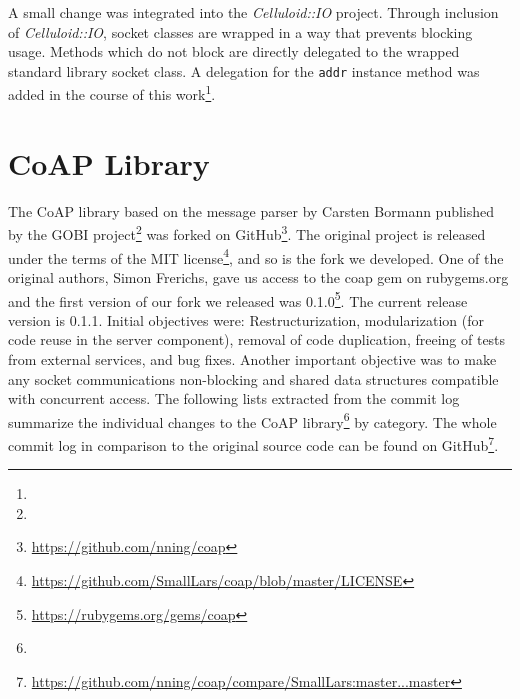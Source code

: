 	A small change was integrated into the \emph{Celluloid::IO} project.
	Through inclusion of \emph{Celluloid::IO}, socket classes are wrapped in a
	way that prevents blocking usage. Methods which do not block are directly
	delegated to the wrapped standard library socket class. A delegation for
	the \texttt{addr} instance method was added in the course of this
	work\footnote{\urlCelluloidIoPr}.

\section{\acs{CoAP} Library}
\label{cha:implementation:client}

	The \ac{CoAP} library based on the message parser by Carsten Bormann
	published by the GOBI project\footnote{\urlGobiCoap} was forked on
	GitHub\footnote{\url{https://github.com/nning/coap}}. The original project
	is released under the terms of the MIT
	license\footnote{\url{https://github.com/SmallLars/coap/blob/master/LICENSE}},
	and so is the fork we developed. One of the original authors, Simon
	Frerichs, gave us access to the coap gem on rubygems.org and the first
	version of our fork we released was
	0.1.0\footnote{\url{https://rubygems.org/gems/coap}}. The current release
	version is 0.1.1. Initial objectives were: Restructurization,
	modularization (for code reuse in the server component), removal of code
	duplication, freeing of tests from external services, and bug fixes.
	Another important objective was to make any socket communications
	non-blocking and shared data structures compatible with concurrent access.
	The following lists extracted from the commit log summarize the individual
	changes to the \ac{CoAP} library\footnote{\urlCoapChanges} by category. The
	whole commit log in comparison to the original source code can be found on
	GitHub\footnote{\url{https://github.com/nning/coap/compare/SmallLars:master...master}}.


